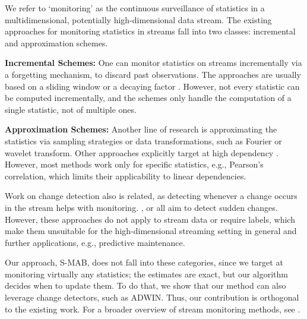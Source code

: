 We refer to `monitoring' as the continuous surveillance of statistics in a multidimensional, potentially high-dimensional data stream. The existing approaches for monitoring statistics in streams fall into two classes: incremental and approximation schemes. 

\textbf{Incremental Schemes:} One can monitor statistics on  streams incrementally via a forgetting mechanism, to discard past observations. 
The approaches are usually based on a sliding window \cite{DBLP:conf/sdm/BifetG07, DBLP:conf/edbt/VollmerRB18} or a decaying factor \cite{koychev2000gradual, DBLP:journals/ida/Klinkenberg04, DBLP:conf/ssdbm/SchubertG18}. 
However, not every statistic can be computed incrementally, and the schemes only handle the computation of a single statistic, not of multiple ones. 

\textbf{Approximation Schemes:} Another line of research is approximating the statistics via sampling strategies \cite{DBLP:conf/soda/BabcockDM02, DBLP:conf/sac/BoidolH17, DBLP:conf/ssdbm/ArzamasovBR19} or data transformations, such as Fourier \cite{DBLP:conf/vldb/ZhuS02, DBLP:conf/iisa/SeliniotakiTCT14} or wavelet \cite{DBLP:journals/vldb/ChakrabartiGRS01, DBLP:conf/kdd/GuhaH05} transform. Other approaches explicitly target at high dependency \cite{DBLP:journals/ngc/KarguptaPKS06, DBLP:conf/kdd/ZhouX08}. However, most methods work only for specific statistics, e.g.,  Pearson's correlation, which limits their applicability to linear dependencies.  

Work on change detection also is related, as detecting whenever a change occurs in the stream helps with monitoring. \cite{DBLP:conf/sdm/NguyenV16a}, \cite{DBLP:conf/kdd/ReisFMB16} or \cite{DBLP:journals/tkde/BlancoCRBDM15} all aim to detect sudden changes. However, these approaches do not apply to stream data or require labels, which make them unsuitable for the high-dimensional streaming setting in general and further applications, e.g., predictive maintenance. %

Our approach, \gls{S-MAB}, does not fall into these categories, since we target at monitoring virtually any statistics; the estimates are exact, but our algorithm decides when to update them. To do that, we show that our method can also leverage change detectors, such as \gls{ADWIN}. Thus, our contribution is orthogonal to the existing work. For a broader overview of stream monitoring methods, see \cite{DBLP:books/daglib/0030859}.

